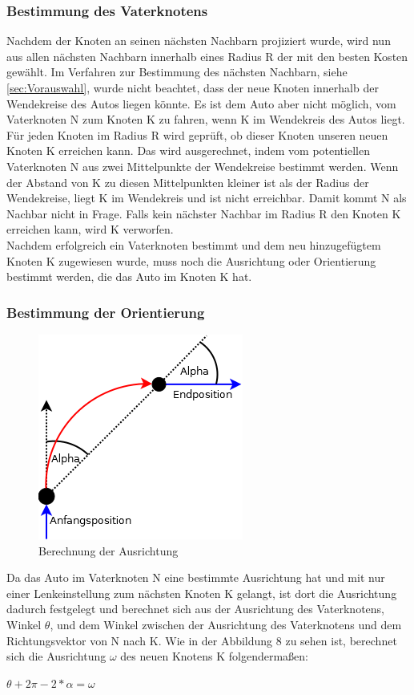 \subsubsection{Bestimmung des Vaterknotens}
Nachdem der Knoten an seinen nächsten Nachbarn projiziert wurde, wird nun aus allen nächsten Nachbarn innerhalb eines Radius R der mit den besten Kosten gewählt. Im Verfahren zur Bestimmung des nächsten Nachbarn, siehe \ref{sec:Vorauswahl}, wurde nicht beachtet, dass der neue Knoten innerhalb der Wendekreise des Autos liegen könnte. Es ist dem Auto aber nicht möglich, vom Vaterknoten N zum Knoten K zu fahren, wenn K im Wendekreis des Autos liegt. \\
Für jeden Knoten im Radius R wird geprüft, ob dieser Knoten unseren neuen Knoten K erreichen kann. Das wird ausgerechnet, indem vom potentiellen Vaterknoten N aus zwei Mittelpunkte der Wendekreise bestimmt werden. Wenn der Abstand von K zu diesen Mittelpunkten kleiner ist als der Radius der Wendekreise, liegt K im Wendekreis und ist nicht erreichbar. Damit kommt N als Nachbar nicht in Frage. Falls kein nächster Nachbar im Radius R den Knoten K erreichen kann, wird K verworfen. \\
Nachdem erfolgreich ein Vaterknoten bestimmt und dem neu hinzugefügtem Knoten K zugewiesen wurde, muss noch die Ausrichtung oder Orientierung bestimmt werden, die das Auto im Knoten K hat.
\subsubsection{Bestimmung der Orientierung}

\begin{figure}
\centering
\includegraphics[scale=0.8]{Bilder/BerechnungOrientierung.png} 
\caption{Berechnung der Ausrichtung}
\end{figure}
Da das Auto im Vaterknoten N eine bestimmte Ausrichtung hat und mit nur einer Lenkeinstellung zum nächsten Knoten K gelangt, ist dort die Ausrichtung dadurch festgelegt und berechnet sich aus der Ausrichtung des Vaterknotens, Winkel $\theta$, und dem Winkel zwischen der Ausrichtung des Vaterknotens und dem Richtungsvektor von N nach K. Wie in der Abbildung 8 zu sehen ist, berechnet sich die Ausrichtung $\omega$ des neuen Knotens K folgendermaßen:
\begin{center}
	$\theta + 2 \pi - 2*\alpha = \omega$
\end{center}

